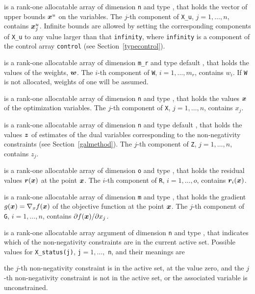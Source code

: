 \documentclass{galahad}
\begin{document}
\begin{description}
 is a rank-one allocatable array of dimension {\tt n} and type
\realdp, that holds
the vector of upper bounds ${\bm{x}}^{u}$ on the variables.
The $j$-th component of {\tt X\_u}, $j = 1, \ldots , n$,
contains ${\bm{x}}_{j}^{u}$.
Infinite bounds are allowed by setting the corresponding
components of {\tt X\_u} to any value larger than that {\tt infinity},
where {\tt infinity} is a component of the control array {\tt control}
(see Section~\ref{typecontrol}).

 is a rank-one allocatable array of dimension {\tt m\_r} and 
type default \realdp, that holds the values of the weights, ${\bm{w}}$.
The $i$-th component of {\tt W}, $i = 1, \ldots , m_r$, contains $w_{i}$.
If {\tt W} is not allocated, weights of one will be assumed.

 is a rank-one allocatable array of dimension {\tt n} and type
\realdp, that holds the values ${\bm{x}}$ of the optimization variables.
The $j$-th component of {\tt X}, $j = 1, \ldots, n$, contains $x_{j}$.

 is a rank-one allocatable array of dimension {\tt n} and type default
\realdp, that holds the values ${\bm{z}}$ of estimates  of the dual variables
corresponding to the non-negativity constraints (see Section~\ref{galmethod}).
The $j$-th component of {\tt Z}, $j = 1, \ldots, n$, contains $z_{j}$.

 is a rank-one allocatable array of dimension {\tt o} and type
\realdp, that holds the residual values ${\bm{r}}({\bm{x}})$
at the point ${\bm{x}}$. The $i$-th component of
{\tt R}, $i = 1, \ldots, o$, contains ${\bm{r}}_{i}({\bm{x}})$.

 is a rank-one allocatable array of dimension {\tt m} and type
\realdp, that holds the gradient $g({\bm{x}}) = \nabla_x f({\bm{x}})$ of the
objective function at the point ${\bm{x}}$. The $j$-th component of
{\tt G}, $i = 1, \ldots, n$, contains $\partial f({\bm{x}})/\partial x_j$.

 is a rank-one allocatable array argument of dimension {\tt n}
and type \integer, that indicates which of the non-negativity constraints
are in the current active set. Possible values for
{\tt X\_status(j)}, {\tt j}$=1, \ldots ,$ {\tt n}, and their meanings are
\begin{description}
 the $j$-th non-negativity constraint
is in the active set, at the value zero, and
  the $j$-th non-negativity constraint is not in the active set,
or the associated variable is unconstrained.
\end{description}

\end{description}
\end{document}
